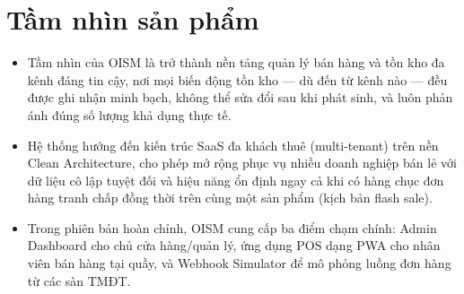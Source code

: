 \section{Tầm nhìn sản phẩm}
\begin{itemize}
    \item Tầm nhìn của OISM là trở thành nền tảng quản lý bán hàng và tồn kho đa kênh đáng tin cậy, nơi mọi biến động tồn kho — dù đến từ kênh nào — đều được ghi nhận minh bạch, không thể sửa đổi sau khi phát sinh, và luôn phản ánh đúng số lượng khả dụng thực tế.
    \item Hệ thống hướng đến kiến trúc SaaS đa khách thuê (multi-tenant) trên nền Clean Architecture, cho phép mở rộng phục vụ nhiều doanh nghiệp bán lẻ với dữ liệu cô lập tuyệt đối và hiệu năng ổn định ngay cả khi có hàng chục đơn hàng tranh chấp đồng thời trên cùng một sản phẩm (kịch bản flash sale).
    \item Trong phiên bản hoàn chỉnh, OISM cung cấp ba điểm chạm chính: Admin Dashboard cho chủ cửa hàng/quản lý, ứng dụng POS dạng PWA cho nhân viên bán hàng tại quầy, và Webhook Simulator để mô phỏng luồng đơn hàng từ các sàn TMĐT.
\end{itemize}
